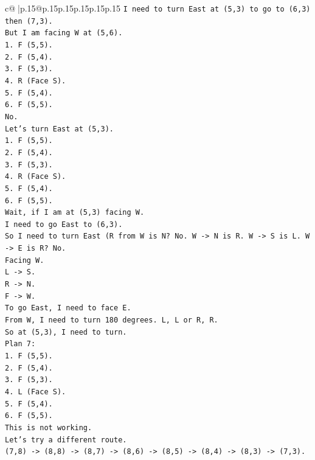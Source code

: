 \documentclass{article}
\begin{document}
{\begin{supertabular}{c@{$\;$}|p{.15\linewidth}@{}p{.15\linewidth}p{.15\linewidth}p{.15\linewidth}p{.15\linewidth}p{.15\linewidth}}
{{{\texttt{I need to turn East at (5,3) to go to (6,3) then (7,3).} \\
\texttt{But I am facing W at (5,6).} \\
\texttt{1. F (5,5).} \\
\texttt{2. F (5,4).} \\
\texttt{3. F (5,3).} \\
\texttt{4. R (Face S).} \\
\texttt{5. F (5,4).} \\
\texttt{6. F (5,5).} \\
\texttt{No.} \\
\texttt{Let's turn East at (5,3).} \\
\texttt{1. F (5,5).} \\
\texttt{2. F (5,4).} \\
\texttt{3. F (5,3).} \\
\texttt{4. R (Face S).} \\
\texttt{5. F (5,4).} \\
\texttt{6. F (5,5).} \\
\texttt{Wait, if I am at (5,3) facing W.} \\
\texttt{I need to go East to (6,3).} \\
\texttt{So I need to turn East (R from W is N? No. W {-}> N is R. W {-}> S is L. W {-}> E is R? No.} \\
\texttt{Facing W.} \\
\texttt{L {-}> S.} \\
\texttt{R {-}> N.} \\
\texttt{F {-}> W.} \\
\texttt{To go East, I need to face E.} \\
\texttt{From W, I need to turn 180 degrees. L, L or R, R.} \\
\texttt{So at (5,3), I need to turn.} \\
\texttt{Plan 7:} \\
\texttt{1. F (5,5).} \\
\texttt{2. F (5,4).} \\
\texttt{3. F (5,3).} \\
\texttt{4. L (Face S).} \\
\texttt{5. F (5,4).} \\
\texttt{6. F (5,5).} \\
\texttt{This is not working.} \\
\texttt{Let's try a different route.} \\
\texttt{(7,8) {-}> (8,8) {-}> (8,7) {-}> (8,6) {-}> (8,5) {-}> (8,4) {-}> (8,3) {-}> (7,3).} \\
}}}
\end{supertabular}}
\end{document}
